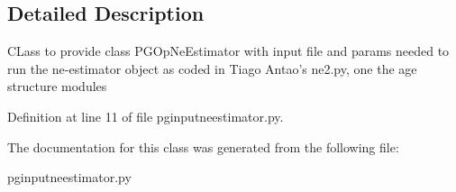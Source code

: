 \subsection{Detailed Description}
\begin{DoxyVerb}CLass to provide class PGOpNeEstimator
with input file and params needed to run
the ne-estimator object as coded in Tiago Antao's
ne2.py, one the age structure modules
\end{DoxyVerb}
 

Definition at line 11 of file pginputneestimator.\+py.



The documentation for this class was generated from the following file\+:\begin{DoxyCompactItemize}
\item 
pginputneestimator.\+py\end{DoxyCompactItemize}
